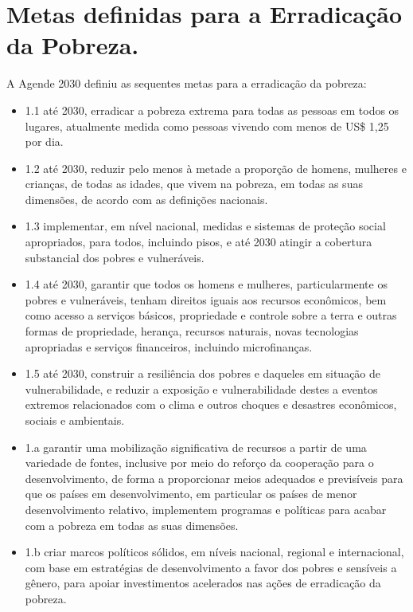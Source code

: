 \section{Metas definidas para a Erradicação da Pobreza.}
A Agende 2030 definiu as sequentes metas para a erradicação da pobreza:
\begin{itemize}
\item    1.1 até 2030, erradicar a pobreza extrema para todas as pessoas em todos os   lugares, atualmente medida como pessoas vivendo com menos de US\$ 1,25 por dia.
\item    1.2 até 2030, reduzir pelo menos à metade a proporção de homens, mulheres e crianças, de todas as idades, que vivem na pobreza, em todas as suas dimensões, de acordo com as definições nacionais. 
\item    1.3 implementar, em nível nacional, medidas e sistemas de proteção social apropriados, para todos, incluindo pisos, e até 2030 atingir a cobertura substancial dos pobres e vulneráveis.
\item    1.4 até 2030, garantir que todos os homens e mulheres, particularmente os pobres e vulneráveis, tenham direitos iguais aos recursos econômicos, bem como acesso a serviços básicos, propriedade e controle sobre a terra e outras formas de propriedade, herança, recursos naturais, novas tecnologias  apropriadas e serviços financeiros, incluindo microfinanças.
\item    1.5 até 2030, construir a resiliência dos pobres e daqueles em situação de vulnerabilidade, e reduzir a exposição e vulnerabilidade destes a eventos extremos relacionados com o clima e outros choques e desastres econômicos, sociais e ambientais.
\item    1.a garantir uma mobilização significativa de recursos a partir de uma variedade de fontes, inclusive por meio do reforço da cooperação para o desenvolvimento, de forma a proporcionar meios adequados e previsíveis para que os países em desenvolvimento, em particular os países de menor desenvolvimento relativo, implementem programas e políticas para acabar com a pobreza em todas as suas dimensões.
\item    1.b criar marcos políticos sólidos, em níveis nacional, regional e internacional, com base em estratégias de desenvolvimento a favor dos pobres e sensíveis a gênero, para apoiar investimentos acelerados nas ações de erradicação da pobreza. 
\end{itemize}

